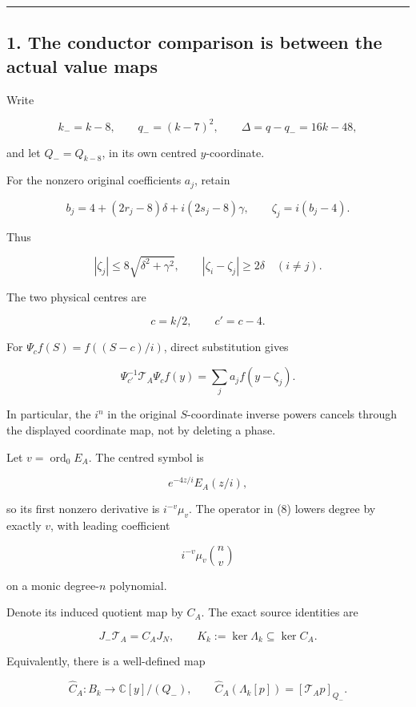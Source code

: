 \documentclass[11pt]{article}
\begin{document}
\begin{center}\rule{0.5\linewidth}{0.5pt}\end{center}

\subsection{1. The conductor comparison is between the actual value maps}\label{the-conductor-comparison-is-between-the-actual-value-maps}

Write

\[
k_-=k-8,\qquad q_-=(k-7)^2,\qquad
\Delta=q-q_-=16k-48,
\]

and let \(Q_-=Q_{k-8}\), in its own centred \(y\)-coordinate.

For the nonzero original coefficients \(a_j\), retain

\[
b_j=4+(2r_j-8)\delta+i(2s_j-8)\gamma,
\qquad
\zeta_j=i(b_j-4).
\]

Thus

\[
|\zeta_j|\le8\sqrt{\delta^2+\gamma^2},
\qquad
|\zeta_i-\zeta_j|\ge2\delta\quad(i\ne j).
\]

The two physical centres are

\[
c=k/2,\qquad c'=c-4.
\]

For \(\Psi_cf(S)=f((S-c)/i)\), direct substitution gives

\[
\boxed{
\Psi_{c'}^{-1}\mathcal T_A\Psi_cf(y)
=
\sum_j a_jf(y-\zeta_j).
}
\tag{8}
\]

In particular, the \(i^n\) in the original \(S\)-coordinate inverse powers cancels through the displayed coordinate map, not by deleting a phase.

Let \(v=\operatorname{ord}_0E_A\). The centred symbol is

\[
e^{-4z/i}E_A(z/i),
\]

so its first nonzero derivative is \(i^{-v}\mu_v\). The operator in (8) lowers degree by exactly \(v\), with leading coefficient

\[
i^{-v}\mu_v\binom nv
\]

on a monic degree-\(n\) polynomial.

Denote its induced quotient map by \(C_A\). The exact source identities are

\[
J_-\mathcal T_A=C_AJ_N,
\qquad
K_k:=\ker\Lambda_k\subseteq\ker C_A.
\tag{9}
\]

Equivalently, there is a well-defined map

\[
\widehat C_A:B_k\longrightarrow \mathbb C[y]/(Q_-),
\qquad
\widehat C_A(\Lambda_k[p])=[\mathcal T_Ap]_{Q_-}.
\]
\end{document}
